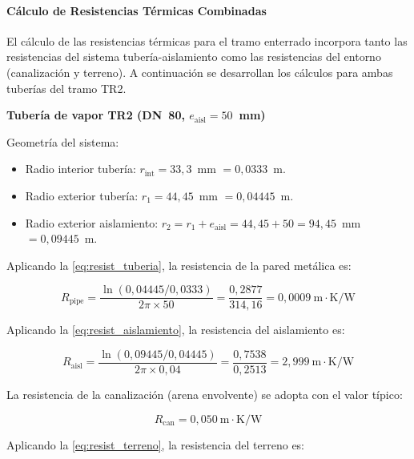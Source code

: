 \paragraph{Cálculo de Resistencias Térmicas Combinadas}
\label{par:resistencias_termicas_combinadas}

El cálculo de las resistencias térmicas para el tramo enterrado incorpora tanto las resistencias del sistema tubería-aislamiento como las resistencias del entorno (canalización y terreno). A continuación se desarrollan los cálculos para ambas tuberías del tramo TR2.

\textbf{Tubería de vapor TR2 (DN~80, $e_{\text{aisl}} = 50$~mm)}

Geometría del sistema:

\begin{itemize}[noitemsep]
	\item Radio interior tubería: $r_{\text{int}} = 33{,}3$~mm $= 0{,}0333$~m.
	\item Radio exterior tubería: $r_1 = 44{,}45$~mm $= 0{,}04445$~m.
	\item Radio exterior aislamiento: $r_2 = r_1 + e_{\text{aisl}} = 44{,}45 + 50 = 94{,}45$~mm $= 0{,}09445$~m.
\end{itemize}

Aplicando la \eqref{eq:resist_tuberia}, la resistencia de la pared metálica es:

\begin{equation}
	R_{\text{pipe}} = \frac{\ln(0{,}04445 / 0{,}0333)}{2\pi \times 50} = \frac{0{,}2877}{314{,}16} = 0{,}0009~\text{m}\cdot\text{K/W}
	\label{eq:resist_pipe_TR2_vap}
\end{equation}

Aplicando la \eqref{eq:resist_aislamiento}, la resistencia del aislamiento es:

\begin{equation}
	R_{\text{aisl}} = \frac{\ln(0{,}09445 / 0{,}04445)}{2\pi \times 0{,}04} = \frac{0{,}7538}{0{,}2513} = 2{,}999~\text{m}\cdot\text{K/W}
	\label{eq:resist_aisl_TR2_vap}
\end{equation}

La resistencia de la canalización (arena envolvente) se adopta con el valor típico:

\begin{equation}
	R_{\text{can}} = 0{,}050~\text{m}\cdot\text{K/W}
	\label{eq:resist_can_TR2}
\end{equation}

Aplicando la \eqref{eq:resist_terreno}, la resistencia del terreno es:

